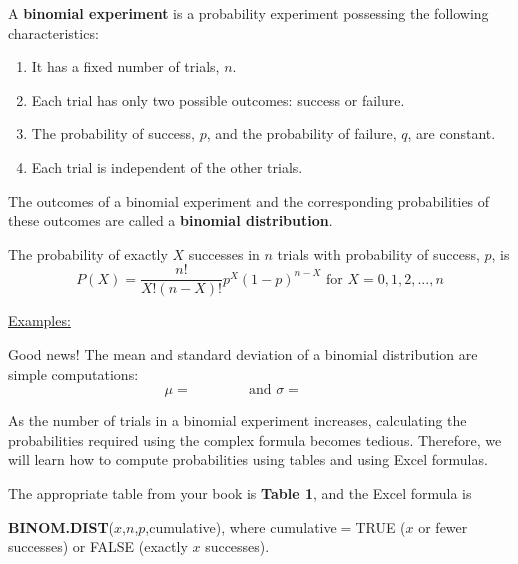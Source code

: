 \documentclass[12pt, letterpaper]{article}
\theoremstyle{definition}
\begin{document}
\begin{defn}
A \textbf{binomial experiment} is a probability experiment possessing the following characteristics:
\begin{enumerate}
\item It has a fixed number of trials, $n$.
\item Each trial has only two possible outcomes:  success or failure.
\item The probability of success, $p$, and the probability of failure, $q$, are constant.
\item Each trial is independent of the other trials.
\end{enumerate}
\end{defn}

\begin{statement}
The outcomes of a binomial experiment and the corresponding probabilities of these outcomes are called a \textbf{binomial distribution}.

The probability of exactly $X$ successes in $n$ trials with probability of success, $p$, is
$$ P(X) = \frac{n!}{X!(n-X)!}p^X(1-p)^{n-X}\text{  for } X=0,1,2,...,n $$

\end{statement}

\underline{Examples:} 

\vspace*{2in}


\newpage


\begin{statement}

Good news!  The mean and standard deviation of a binomial distribution are simple computations:
$$ \mu = ~~~~~~~~~~~~~~~~~\text{ and } \sigma=~~~~~~~~~~~~~~~~~ $$

\vspace*{.2in}

As the number of trials in a binomial experiment increases, calculating the probabilities required using the complex formula becomes tedious.  Therefore, we will learn how to compute probabilities using tables and using Excel formulas.

\vspace*{.2in}

The appropriate table from your book is \textbf{Table 1}, and the Excel formula is 

\textbf{BINOM.DIST}($x$,$n$,$p$,cumulative), where cumulative$=$TRUE ($x$ or fewer successes) or FALSE (exactly $x$ successes).


\end{statement}
\end{document}
